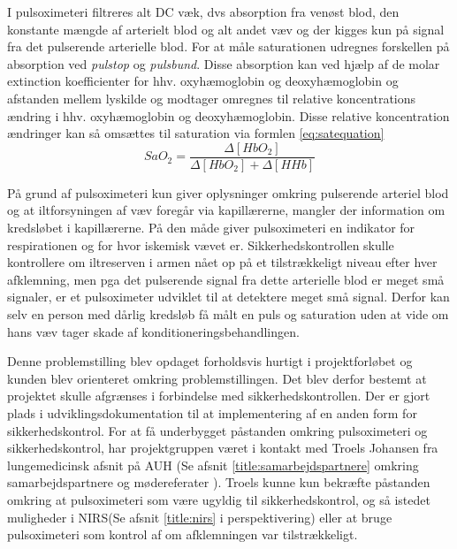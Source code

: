 I pulsoximeteri filtreres alt DC væk, dvs absorption fra venøst blod, den konstante mængde af arterielt blod og alt andet væv og der kigges kun på signal fra det pulserende arterielle blod. For at måle saturationen udregnes forskellen på absorption ved \textit{pulstop} og \textit{pulsbund}. Disse absorption kan ved hjælp af de molar extinction koefficienter for hhv. oxyhæmoglobin og deoxyhæmoglobin og afstanden mellem lyskilde og modtager omregnes til relative koncentrations ændring i hhv. oxyhæmoglobin og deoxyhæmoglobin. Disse relative koncentration ændringer kan så omsættes til saturation via formlen \ref{eq:satequation}
\begin{equation}
	SaO_2 = \frac{\Delta[HbO_2]}{\Delta[HbO_2]+\Delta[HHb]}
	\label{eq:satequation}
\end{equation}

På grund af pulsoximeteri kun giver oplysninger omkring pulserende arteriel blod og at iltforsyningen af væv foregår via kapillærerne, mangler der information om kredsløbet i kapillærerne. På den måde giver pulsoximeteri en indikator for respirationen og for hvor iskemisk vævet er. Sikkerhedskontrollen skulle kontrollere om iltreserven i armen nået op på et tilstrækkeligt niveau efter hver afklemning, men pga det pulserende signal fra dette arterielle blod er meget små signaler, er et pulsoximeter udviklet til at detektere meget små signal. Derfor kan selv en person med dårlig kredsløb få målt en puls og saturation uden at vide om hans væv tager skade af konditioneringsbehandlingen. 

Denne problemstilling blev opdaget forholdsvis hurtigt i projektforløbet og kunden blev orienteret omkring problemstillingen. Det blev derfor bestemt at projektet skulle afgrænses i forbindelse med sikkerhedskontrollen. Der er gjort plads i udviklingsdokumentation til at implementering af en anden form for sikkerhedskontrol. For at få underbygget påstanden omkring pulsoximeteri og sikkerhedskontrol, har projektgruppen været i kontakt med Troels Johansen fra lungemedicinsk afsnit på AUH (Se afsnit \ref{title:samarbejdspartnere} omkring samarbejdspartnere og mødereferater ). Troels kunne kun bekræfte påstanden omkring at pulsoximeteri som være ugyldig til sikkerhedskontrol, og så istedet muligheder i NIRS(Se afsnit \ref{title:nirs} i perspektivering) eller at bruge pulsoximeteri som kontrol af om afklemningen var tilstrækkeligt. 

